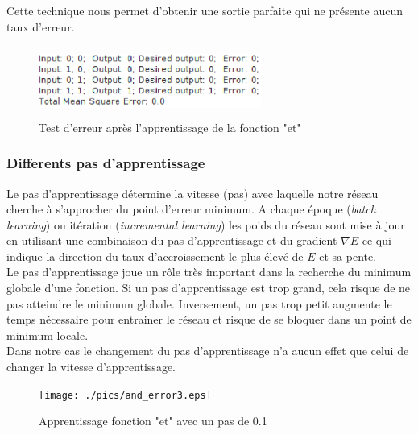 \documentclass[twoside,openright,a4paper,11pt,french]{article}
\begin{document}
Cette technique nous permet d'obtenir une sortie parfaite qui ne présente
aucun taux d'erreur.



\begin{figure}[h]
\centering
\includegraphics[width=7.3cm,height=2.3cm]{./pics/andtest2.eps}
\caption{Test d'erreur après l'apprentissage de la fonction "et"}
\label{fig:andtest2}
\end{figure}


\subsubsection{Differents pas d'apprentissage}

Le pas d'apprentissage détermine la vitesse (pas) avec laquelle notre réseau
cherche à s'approcher du point d'erreur minimum. 
A chaque époque ({\it batch learning}) ou itération ({\it incremental
learning}) les poids du réseau sont mise à jour en utilisant une combinaison du
pas d'apprentissage et du gradient $\nabla E$ ce qui indique la direction du taux
d'accroissement le plus élevé de $E$ et sa pente.\\

Le pas d'apprentissage joue un rôle très important dans la recherche du
minimum globale d'une fonction. 
Si un pas d'apprentissage est trop grand, cela risque de ne pas atteindre le minimum globale.
Inversement, un pas trop petit augmente le temps nécessaire pour entrainer le réseau et risque de
se bloquer dans un point de minimum locale.\\

Dans notre cas le changement du pas d'apprentissage n'a aucun effet que celui 
de changer la vitesse d'apprentissage.


\begin{figure}[h]
\centering
\texttt{[image: ./pics/and\_error3.eps]}
\caption{Apprentissage fonction "et" avec un pas de 0.1}
\label{fig:anderr3}
\end{figure}
\end{document}
